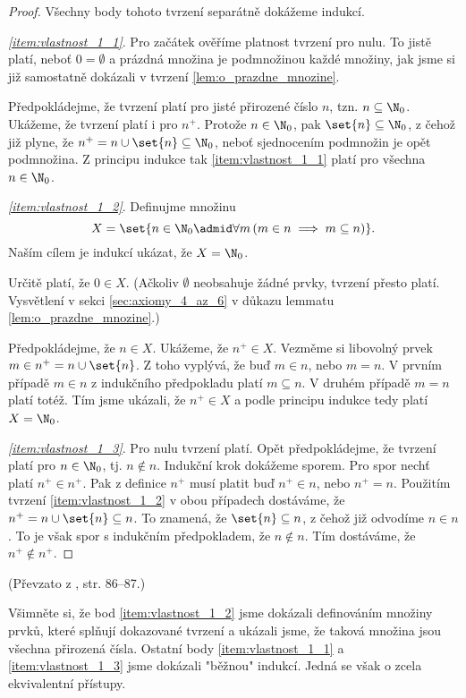 \begin{proof}
    Všechny body tohoto tvrzení separátně dokážeme indukcí.\par
    \textit{\ref{item:vlastnost_1_1}}. Pro začátek ověříme platnost tvrzení pro nulu. To jistě platí, neboť $0=\emptyset$ a prázdná množina je podmnožinou každé množiny, jak jsme si již samostatně dokázali v tvrzení \ref{lem:o_prazdne_mnozine}.\par
    Předpokládejme, že tvrzení platí pro jisté přirozené číslo $n$, tzn. $n\subseteq\N_0$. Ukážeme, že tvrzení platí i pro $n^+$. Protože $n\in\N_0$, pak $\set{n}\subseteq\N_0$, z čehož již plyne, že $n^+=n\cup\set{n}\subseteq\N_0$, neboť sjednocením podmnožin je opět podmnožina. Z principu indukce tak \ref{item:vlastnost_1_1} platí pro všechna $n\in\N_0$.\par
    \textit{\ref{item:vlastnost_1_2}}. Definujme množinu
    \begin{equation*}
        X=\set{n\in\N_0\admid \forall m\,(m\in n\implies m\subseteq n)}.
    \end{equation*} 
    Naším cílem je indukcí ukázat, že $X=\N_0$.\par
    Určitě platí, že $0\in X$. (Ačkoliv $\emptyset$ neobsahuje žádné prvky, tvrzení přesto platí. Vysvětlení v sekci \ref{sec:axiomy_4_az_6} v důkazu lemmatu \ref{lem:o_prazdne_mnozine}.)\par
    Předpokládejme, že $n\in X$. Ukážeme, že $n^+\in X$. Vezměme si libovolný prvek $m\in n^+=n\cup\set{n}$. Z toho vyplývá, že buď $m\in n$, nebo $m=n$. V prvním případě $m\in n$ z indukčního předpokladu platí $m\subseteq n$. V druhém případě $m=n$ platí totéž. Tím jsme ukázali, že $n^+\in X$ a podle principu indukce tedy platí $X=\N_0$.\par
    \textit{\ref{item:vlastnost_1_3}}. Pro nulu tvrzení platí. Opět předpokládejme, že tvrzení platí pro $n\in\N_0$, tj. $n\notin n$. Indukční krok dokážeme sporem. Pro spor nechť platí $n^+\in n^+$. Pak z definice $n^+$ musí platit buď $n^+\in n$, nebo $n^+=n$. Použitím tvrzení \ref{item:vlastnost_1_2} v obou případech dostáváme, že $n^+=n\cup\set{n}\subseteq n$. To znamená, že $\set{n}\subseteq n$, z čehož již odvodíme $n\in n$. To je však spor s indukčním předpokladem, že $n\notin n$. Tím dostáváme, že $n^+\notin n^+$.
\end{proof}
(Převzato z \cite{BalcarStepanek1986}, str. 86--87.)\par
Všimněte si, že bod \ref{item:vlastnost_1_2} jsme dokázali definováním množiny prvků, které splňují dokazované tvrzení a ukázali jsme, že taková množina jsou všechna přirozená čísla. Ostatní body \ref{item:vlastnost_1_1} a \ref{item:vlastnost_1_3} jsme dokázali "běžnou" indukcí. Jedná se však o zcela ekvivalentní přístupy.
\medskip


